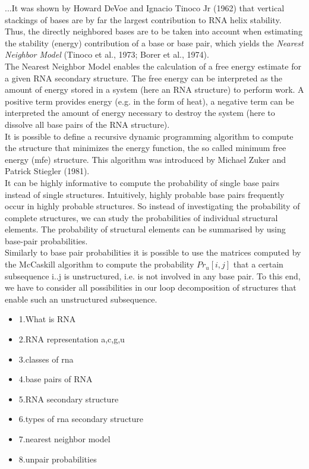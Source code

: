 \documentclass[twoside,a4paper]{report}
\begin{document}
 	 ...It was shown by Howard DeVoe and Ignacio Tinoco Jr (1962) that vertical stackings of bases are by far the largest contribution to RNA helix stability.  Thus, the directly neighbored bases are to be taken into account when estimating the stability (energy) contribution of a base or base pair, which yields the \textit{Nearest Neighbor Model} (Tinoco et al., 1973; Borer et al., 1974).\\
 	 The Nearest Neighbor Model enables the calculation of a free energy estimate for a given RNA secondary structure. The free energy can be interpreted as the amount of energy stored in a system (here an RNA structure) to perform work. A positive term provides energy (e.g. in the form of heat), a negative term can be interpreted the amount of energy necessary to destroy the system (here to dissolve all base pairs of the RNA structure).\\
 	 It is possible to define a recursive dynamic programming algorithm to compute the structure that minimizes the energy function, the so called minimum free energy (mfe) structure. This algorithm was introduced by Michael Zuker and Patrick Stiegler (1981).\\
 	 It can be highly informative to compute the probability of single base pairs instead of single structures. Intuitively, highly probable base pairs frequently occur in highly probable structures. So instead of investigating the probability of complete structures, we can study the probabilities of individual structural elements. The probability of structural elements can be summarised by using base-pair probabilities.\\
 	 Similarly to base pair probabilities it is possible to use the matrices computed by the McCaskill algorithm to compute the probability $Pr_u[i,j]$ that a certain subsequence i..j is unstructured, i.e. is not involved in any base pair. To this end, we have to consider all possibilities in our loop decomposition of structures that enable such an unstructured subsequence.
 	 
 	 
 	 
	\begin{itemize}
	 	\item 1.What is RNA
	 	\item 2.RNA representation {a,c,g,u}
	 	\item 3.classes of rna
	 	\item 4.base pairs of RNA
	 	\item 5.RNA secondary structure
	 	\item 6.types of rna secondary structure
	 	\item 7.nearest neighbor model
	 	\item 8.unpair probabilities 
	\end{itemize}
\end{document}

